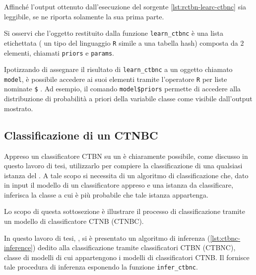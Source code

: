 \vspace*{8pt}

\cleardoublepage
Affinché l'output ottenuto dall'esecuzione del sorgente \ref{lst:rctbn-learc-ctbnc} sia leggibile, se ne riporta solamente la sua prima parte.

\vspace*{8pt}\vspace*{8pt}

Si osservi che l'oggetto restituito dalla funzione \lstinline[language=rstats]{learn_ctbnc} è una lista etichettata (\ie{} un tipo del linguaggio \lstinline$R$ simile a una tabella hash) composta da $2$ elementi, chiamati \lstinline$priors$ e \lstinline$params$.

Ipotizzando di assegnare il risultato di \lstinline[language=rstats]{learn_ctbnc} a un oggetto chiamato \lstinline$model$, è possibile accedere ai suoi elementi tramite l'operatore \lstinline$R$ per liste nominate \lstinline[]|$|%
. Ad esempio, il comando \lstinline[]|model$priors| permette di accedere alla distribuzione di probabilità a priori della variabile classe come visibile dall'output mostrato.

\subsection{Classificazione di un CTNBC}
Appreso un classificatore \acs{CTBN} su un \emph{} è chiaramente possibile, come discusso in questo lavoro di tesi, utilizzarlo per compiere la classificazione di una qualsiasi istanza del \emph{}. A tale scopo si necessita di un algoritmo di classificazione che, dato in input il modello di un classificatore appreso e una istanza da classificare, inferisca la classe a cui è più probabile che tale istanza appartenga.

Lo scopo di questa sottosezione è illustrare il processo di classificazione tramite un modello di classificatore \acs{CTNB} (\acs{CTNBC}).

In questo lavoro di tesi, , si è presentato un algoritmo di inferenza (\autoref{lst:ctbnc-inference}) dedito alla classificazione tramite classificatori \acl{CTBN} (\acs{CTBNC}), classe di modelli di \emph{} cui appartengono i modelli di classificatori \acs{CTNB}. Il \pacchettor{} fornisce tale procedura di inferenza esponendo la funzione \lstinline[language=rstats]{infer_ctbnc}.

